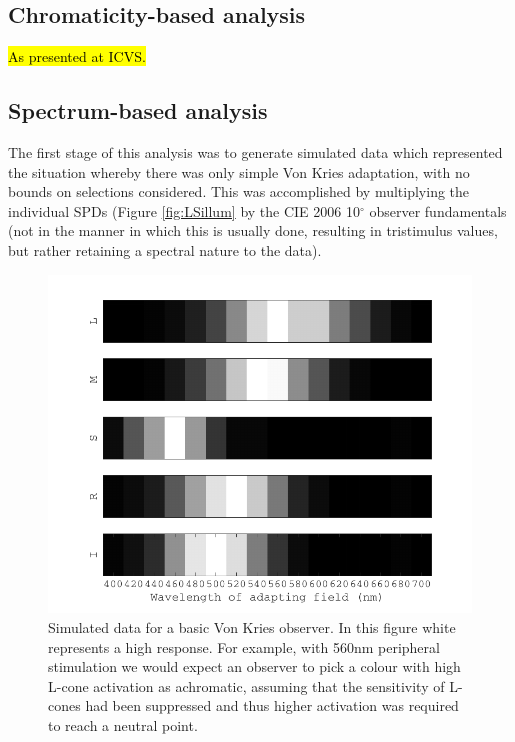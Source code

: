 \subsection{Chromaticity-based analysis}

\hl{As presented at ICVS.}

\subsection{Spectrum-based analysis}

The first stage of this analysis was to generate simulated data which represented the situation whereby there was only simple Von Kries adaptation, with no bounds on selections considered. This was accomplished by multiplying the individual \glspl{SPD} (Figure \ref{fig:LSillum} by the CIE 2006 10$^{\circ}$ observer fundamentals (not in the manner in which this is usually done, resulting in tristimulus values, but rather retaining a spectral nature to the data).

\begin{figure}[htbp]
\includegraphics[max width=\textwidth]{figs/LargeSphere/LSsimdata.pdf}
\caption{Simulated data for a basic Von Kries observer. In this figure white represents a high response. For example, with 560nm peripheral stimulation we would expect an observer to pick a colour with high L-cone activation as achromatic, assuming that the sensitivity of L-cones had been suppressed and thus higher activation was required to reach a neutral point.}
\label{fig:LSsimdata}
\end{figure}


